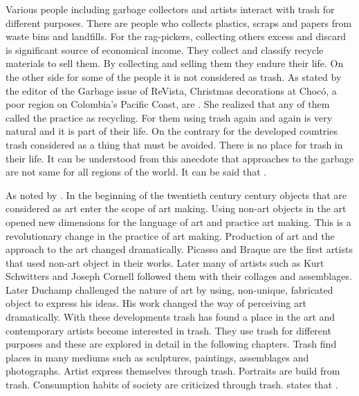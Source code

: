 Various people including garbage collectors and artists interact with trash for different purposes. There are people who collects plastics, scraps and papers from waste bins and landfills. For the rag-pickers, collecting others excess and discard is significant source of economical income. They collect and classify recycle materials to sell them. By collecting and selling them they endure their life. On the other side for some of the people it is not considered as trash. As stated by the editor of the Garbage issue of ReVista, Christmas decorations at Chocó, a poor region on Colombia’s Pacific Coast, are  \citep{erlick2015editorsletter}. She realized that any of them called the practice as recycling. For them using trash again and again is very natural and it is part of their life. On the contrary for the developed countries trash considered as a thing that must be avoided. There is no place for trash in their life. It can be understood from this anecdote that approaches to the garbage are not same for all regions of the world. It can be said that  \citep[xxvi]{zimring2012encyclopedia}.

As noted by \cite{pye2010trashculture} . In the beginning of the twentieth century century objects that are considered as art enter the scope of art making. Using non-art objects in the art opened new dimensions for the language of art and practice art making. This is a revolutionary change in the practice of art making. Production of art and the approach to the art changed dramatically. Picasso and Braque are the first artists that used non-art object in their works. Later many of artists such as Kurt Schwitters and Joseph Cornell followed them with their collages and assemblages. Later Duchamp challenged the nature of art by using, non-unique, fabricated object to express his ideas. His work changed the way of perceiving art dramatically. With these developments trash has found a place in the art and contemporary artists become interested in trash. They use trash for different purposes and these are explored in detail in the following chapters. Trash find places in many mediums such as sculptures, paintings, assemblages and photographs. Artist express themselves through trash. Portraits are build from trash. Consumption habits of society are criticized through trash. \citet[2]{pye2010trashculture} states that .



